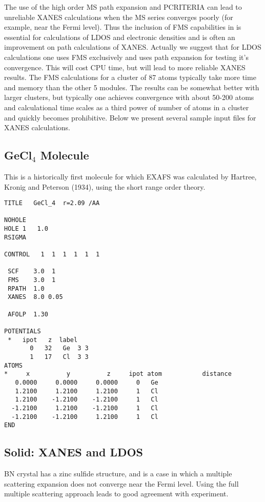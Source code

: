 \documentclass[11pt,oneside]{report} %
\begin{document}
The use of the high order MS path expansion and PCRITERIA  can
lead to unreliable XANES calculations when the MS series converges
poorly (for example, near the Fermi level). Thus the inclusion
of FMS capabilities in {\feffcur} is essential for calculations of LDOS and
electronic densities and is often an improvement on path calculations
of XANES.  Actually we suggest that for LDOS calculations
one uses FMS exclusively and uses path expansion for testing it's convergence.
This will cost CPU time, but will lead to more
reliable XANES results. The FMS calculations for a cluster of 87 atoms
typically take more time and memory than the other 5 modules. The
results can be somewhat better with larger clusters, but typically
one achieves convergence with about 50-200 atoms and calculational
time scales as a third power of number of atoms in a cluster and
quickly becomes prohibitive.
Below we present several sample input files for XANES calculations.


\subsection{GeCl$_4$ Molecule}
\label{sec:Molecule-1}

This is a historically first molecule for which EXAFS was calculated
by Hartree, Kronig and Peterson (1934), using the short range order
theory.

\begin{verbatim}
TITLE   GeCl_4  r=2.09 /AA

NOHOLE
HOLE 1   1.0
RSIGMA

CONTROL   1  1  1  1  1  1

 SCF    3.0  1
 FMS    3.0  1
 RPATH  1.0
 XANES  8.0 0.05

 AFOLP  1.30

POTENTIALS
 *   ipot   z  label
       0   32   Ge  3 3
       1   17   Cl  3 3
ATOMS
*     x          y          z     ipot atom           distance
   0.0000     0.0000     0.0000     0   Ge
   1.2100     1.2100     1.2100     1   Cl
   1.2100    -1.2100    -1.2100     1   Cl
  -1.2100     1.2100    -1.2100     1   Cl
  -1.2100    -1.2100     1.2100     1   Cl
END
\end{verbatim}


\subsection{Solid: XANES and LDOS}
\label{sec:Solid-1}

BN crystal has a zinc sulfide structure, and is a case in which a
multiple scattering expansion does not converge near the Fermi level.
Using the full multiple scattering approach leads to good agreement
with experiment.
\end{document}
